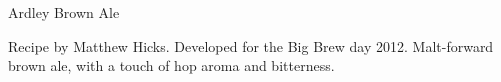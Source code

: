 \begin{recipe}{Ardley Brown Ale}

\begin{aboutblock}
Recipe by Matthew Hicks. Developed for the Big Brew day 2012. Malt-forward brown ale,
with a touch of hop aroma and bitterness. \sourceaha
\end{aboutblock}


\begin{methodandtiming}

\begin{mashsteps}
\end{mashsteps}

\begin{fermentationsteps}
\end{fermentationsteps}

\end{methodandtiming}

\recipebreak

\begin{ingredientsblock}

\begin{malts}
\end{malts}

\begin{hops}
\end{hops}


\end{ingredientsblock}

\end{recipe}

